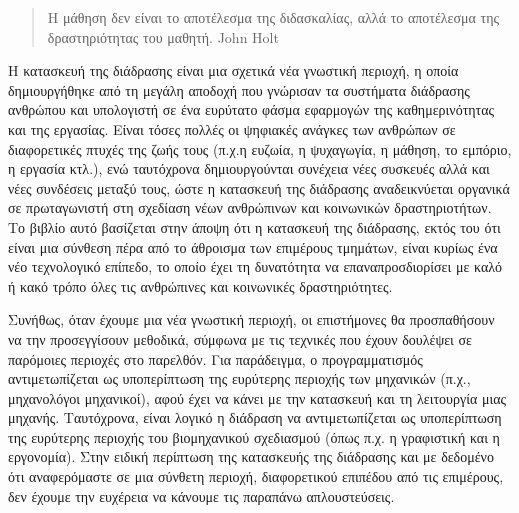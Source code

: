 \documentclass[
]{article}
\begin{document}
\begin{quote}
Η μάθηση δεν είναι το αποτέλεσμα της διδασκαλίας, αλλά το αποτέλεσμα της
δραστηριότητας του μαθητή. John Holt
\end{quote}

Η κατασκευή της διάδρασης είναι μια σχετικά νέα γνωστική περιοχή, η
οποία δημιουργήθηκε από τη μεγάλη αποδοχή που γνώρισαν τα συστήματα
διάδρασης ανθρώπου και υπολογιστή σε ένα ευρύτατο φάσμα εφαρμογών της
καθημερινότητας και της εργασίας. Είναι τόσες πολλές οι ψηφιακές ανάγκες
των ανθρώπων σε διαφορετικές πτυχές της ζωής τους (π.χ.η ευζωία, η
ψυχαγωγία, η μάθηση, το εμπόριο, η εργασία κτλ.), ενώ ταυτόχρονα
δημιουργούνται συνέχεια νέες συσκευές αλλά και νέες συνδέσεις μεταξύ
τους, ώστε η κατασκευή της διάδρασης αναδεικνύεται οργανικά σε
πρωταγωνιστή στη σχεδίαση νέων ανθρώπινων και κοινωνικών δραστηριοτήτων.
Το βιβλίο αυτό βασίζεται στην άποψη ότι η κατασκευή της διάδρασης, εκτός
του ότι είναι μια σύνθεση πέρα από το άθροισμα των επιμέρους τμημάτων,
είναι κυρίως ένα νέο τεχνολογικό επίπεδο, το οποίο έχει τη δυνατότητα να
επαναπροσδιορίσει με καλό ή κακό τρόπο όλες τις ανθρώπινες και
κοινωνικές δραστηριότητες.

Συνήθως, όταν έχουμε μια νέα γνωστική περιοχή, οι επιστήμονες θα
προσπαθήσουν να την προσεγγίσουν μεθοδικά, σύμφωνα με τις τεχνικές που
έχουν δουλέψει σε παρόμοιες περιοχές στο παρελθόν. Για παράδειγμα, ο
προγραμματισμός αντιμετωπίζεται ως υποπερίπτωση της ευρύτερης περιοχής
των μηχανικών (π.χ., μηχανολόγοι μηχανικοί), αφού έχει να κάνει με την
κατασκευή και τη λειτουργία μιας μηχανής. Ταυτόχρονα, είναι λογικό η
διάδραση να αντιμετωπίζεται ως υποπερίπτωση της ευρύτερης περιοχής του
βιομηχανικού σχεδιασμού (όπως π.χ. η γραφιστική και η εργονομία). Στην
ειδική περίπτωση της κατασκευής της διάδρασης και με δεδομένο ότι
αναφερόμαστε σε μια σύνθετη περιοχή, διαφορετικού επιπέδου από τις
επιμέρους, δεν έχουμε την ευχέρεια να κάνουμε τις παραπάνω
απλουστεύσεις.
\end{document}
